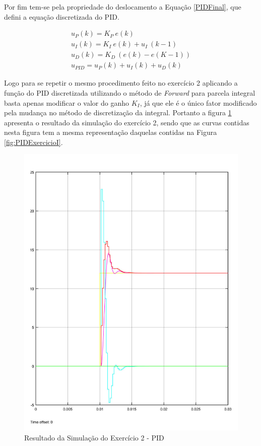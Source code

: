 	Por fim tem-se pela propriedade do deslocamento a Equação \ref{PIDFinal}, que defini a equação discretizada do PID.
	
	\begin{eqnarray}
		u_P (k) = K_P~e(k) \\
		u_I (k) = K_I~e(k) + u_I~(k-1) \\
		u_D (k) = K_D~(e(k) - e(K - 1)) \\
		u_{PID} = u_P(k) + u_I (k) + u_D(k)
		\label{PIDFinal}	
	\end{eqnarray}
	
	Logo para se repetir o mesmo procedimento feito no exercício 2 aplicando a função do PID discretizada utilizando o método de \emph{Forward}  para parcela integral basta apenas
	modificar o valor do ganho $K_I$, já que ele é o único fator modificado pela mudança no método de discretização da integral. Portanto a figura \ref{fig:PIDExercicioII} apresenta o resultado da simulação do exercício 2, sendo que as curvas contidas nesta figura tem a mesma representação daquelas contidas  na Figura \ref{fig:PIDExercicioI}. 
	
	\begin{figure}[H]
		\centering
		\includegraphics[scale = .7]{Imagens/PIDExercicioII.pdf}
		\caption{Resultado da Simulação do Exercício 2 - PID}
		\label{fig:PIDExercicioII}
	\end{figure}
	
